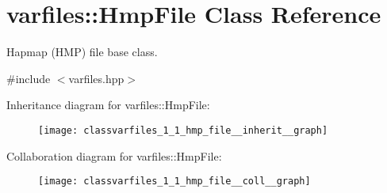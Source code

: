 \hypertarget{classvarfiles_1_1_hmp_file}{}\section{varfiles\+:\+:Hmp\+File Class Reference}
\label{classvarfiles_1_1_hmp_file}


Hapmap (H\+MP) file base class.  




{\ttfamily \#include $<$varfiles.\+hpp$>$}



Inheritance diagram for varfiles\+:\+:Hmp\+File\+:\nopagebreak
\begin{figure}[H]
\begin{center}
\leavevmode
\texttt{[image: classvarfiles\_1\_1\_hmp\_file\_\_inherit\_\_graph]}
\end{center}
\end{figure}


Collaboration diagram for varfiles\+:\+:Hmp\+File\+:\nopagebreak
\begin{figure}[H]
\begin{center}
\leavevmode
\texttt{[image: classvarfiles\_1\_1\_hmp\_file\_\_coll\_\_graph]}
\end{center}
\end{figure}
